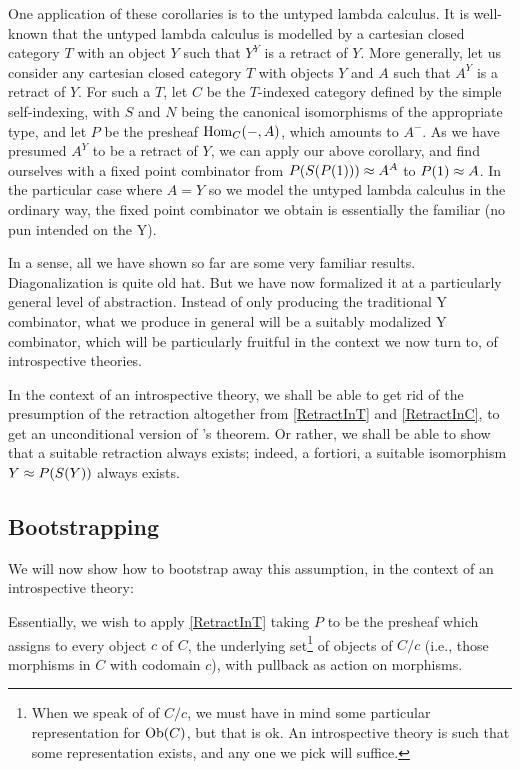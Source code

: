 \begin{observation}\label{YCombinator}
One application of these corollaries is to the untyped lambda calculus. It is well-known that the untyped lambda calculus is modelled by a cartesian closed category $T$ with an object $Y$ such that $Y^Y$ is a retract of $Y$. More generally, let us consider any cartesian closed category $T$ with objects $Y$ and $A$ such that $A^Y$ is a retract of $Y$. For such a $T$, let $C$ be the $T$-indexed category defined by the simple self-indexing, with $S$ and $N$ being the canonical isomorphisms of the appropriate type, and let $P$ be the presheaf $\operatorname{Hom}_C(-, A)$, which amounts to $A^{-}$. As we have presumed $A^Y$ to be a retract of $Y$, we can apply our above corollary, and find ourselves with a fixed point combinator from $P(S(P(1))) \approx A^A$ to $P(1) \approx A$. In the particular case where $A = Y$ so we model the untyped lambda calculus in the ordinary way, the fixed point combinator we obtain is essentially the familiar  (no pun intended on the Y).
\end{observation}

In a sense, all we have shown so far are some very familiar results. Diagonalization is quite old hat. But we have now formalized it at a particularly general level of abstraction. Instead of only producing the traditional Y combinator, what we produce in general will be a suitably modalized Y combinator, which will be particularly fruitful in the context we now turn to, of introspective theories.

In the context of an introspective theory, we shall be able to get rid of the presumption of the retraction altogether from \cref{RetractInT} and \cref{RetractInC}, to get an unconditional version of \Loeb's theorem. Or rather, we shall be able to show that a suitable retraction always exists; indeed, a fortiori, a suitable isomorphism $Y \approx P(S(Y))$ always exists.

\subsection{Bootstrapping}
We will now show how to bootstrap away this assumption, in the context of an introspective theory:

Essentially, we wish to apply \cref{RetractInT} taking $P$ to be the presheaf which assigns to every object $c$ of $C$, the underlying set\footnote{When we speak of  of $C/c$, we must have in mind some particular representation for $\operatorname{Ob}(C)$, but that is ok. An introspective theory is such that some representation exists, and any one we pick will suffice.} of objects of $C/c$ (i.e., those morphisms in $C$ with codomain $c$), with pullback as action on morphisms.

